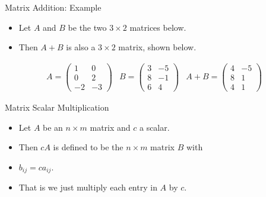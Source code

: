 \documentclass{beamer}
\begin{document}
\begin{frame}{Matrix Addition: Example}

\begin{itemize}
\item Let $A$ and $B$ be the two $3\times 2$ matrices below.
\item Then $A+B$ is also a $3\times 2$ matrix, shown below.
\end{itemize}

$$
\begin{matrix}
A =

\begin{pmatrix}
1 & 0 \\
0 & 2 \\
-2 & -3
\end{pmatrix}

&

B =

\begin{pmatrix}
3 & -5 \\
8 & -1 \\
6 & 4
\end{pmatrix}

&

A + B =

\begin{pmatrix}
4 & -5 \\
8 & 1 \\
4 & 1
\end{pmatrix}

\end{matrix}
$$

\end{frame}


\begin{frame}{Matrix Scalar Multiplication}

\begin{itemize}
\item Let $A$ be an $n\times m$ matrix and $c$ a scalar.
\item Then $cA$ is defined to be the $n\times m$ matrix $B$ with
\item $b_{ij} = c a_{ij}$.
\item That is we just multiply each entry in $A$ by $c$.
\end{itemize}

\end{frame}


\end{document}
